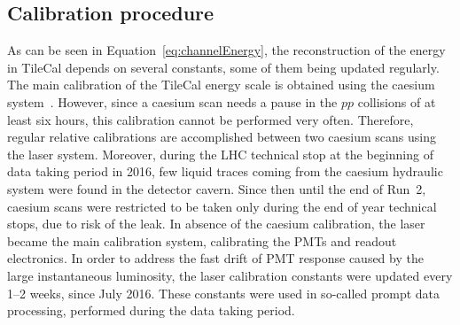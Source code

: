 
\subsection{Calibration procedure}



As can be seen in Equation~\ref{eq:channelEnergy}, the reconstruction of the energy in TileCal depends on several constants, some of them being updated regularly. The main calibration of the TileCal energy scale is obtained using the caesium system~\cite{Blanchot:2020lyh}. However, since a caesium scan needs a pause in the $pp$ collisions of at least six hours, this calibration cannot be performed very often. Therefore, regular relative calibrations are accomplished between two caesium scans using the laser system. Moreover, during the LHC technical stop at the beginning of data taking period in 2016, few liquid traces coming from the caesium hydraulic system were found in the detector cavern. Since then until the end of Run~2, caesium scans were restricted to be taken only during the end of year technical stops, due to risk of the leak. In absence of the caesium calibration, the laser became the main calibration system, calibrating the PMTs and readout electronics. In order to address the fast drift of PMT response caused by the large instantaneous luminosity, the laser calibration constants were updated every 1--2 weeks, since July 2016. These constants were used in so-called prompt data processing, performed during the data taking period. 

